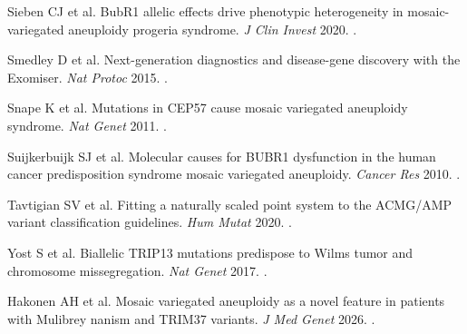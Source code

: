 \documentclass[10pt]{article}
\begin{document}
\begin{refs}
\item Sieben CJ et al. BubR1 allelic effects drive phenotypic heterogeneity in mosaic-variegated aneuploidy progeria syndrome. \textit{J Clin Invest} 2020. .
\item Smedley D et al. Next-generation diagnostics and disease-gene discovery with the Exomiser. \textit{Nat Protoc} 2015. .
\item Snape K et al. Mutations in CEP57 cause mosaic variegated aneuploidy syndrome. \textit{Nat Genet} 2011. .
\item Suijkerbuijk SJ et al. Molecular causes for BUBR1 dysfunction in the human cancer predisposition syndrome mosaic variegated aneuploidy. \textit{Cancer Res} 2010. .
\item Tavtigian SV et al. Fitting a naturally scaled point system to the ACMG/AMP variant classification guidelines. \textit{Hum Mutat} 2020. .
\item Yost S et al. Biallelic TRIP13 mutations predispose to Wilms tumor and chromosome missegregation. \textit{Nat Genet} 2017. .
\item Hakonen AH et al. Mosaic variegated aneuploidy as a novel feature in patients with Mulibrey nanism and TRIM37 variants. \textit{J Med Genet} 2026. .
\end{refs}

\clearpage
\appendix

\end{document}
